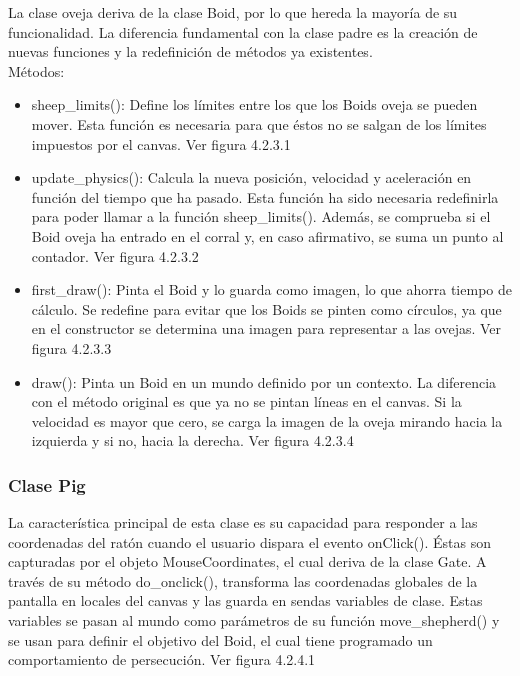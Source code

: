 La clase oveja deriva de la clase Boid, por lo que hereda la mayoría de su funcionalidad. La diferencia fundamental con la clase padre es 
la creación de nuevas funciones y la redefinición de métodos ya existentes.\\

Métodos:
\begin{itemize}
\item sheep\_limits(): Define los límites entre los que los Boids oveja se pueden mover. Esta función es necesaria para que éstos no se 
salgan de los límites impuestos por el canvas. Ver figura 4.2.3.1

\item  update\_physics(): Calcula la nueva posición, velocidad y aceleración en función del tiempo que ha pasado. Esta función ha sido 
necesaria redefinirla para poder llamar a la función sheep\_limits(). Además, se comprueba si el Boid oveja ha entrado en el corral y, en 
caso afirmativo, se suma un punto al contador. Ver figura 4.2.3.2

\item  first\_draw():  Pinta el Boid y lo guarda como imagen, lo que ahorra tiempo de cálculo. Se redefine para evitar que los Boids se 
pinten como círculos, ya que en el constructor se determina una imagen para representar a las ovejas. Ver figura 4.2.3.3

\item  draw(): Pinta un Boid en un mundo definido por un contexto. La diferencia con el método original es que ya no se pintan líneas en 
el canvas. Si la velocidad es mayor que cero, se carga la imagen de la oveja mirando hacia la izquierda y si no, hacia la derecha. 
Ver figura 4.2.3.4

\end{itemize}



\subsubsection{Clase Pig}
\label{subsubsection:pig}

La característica principal de esta clase es su capacidad para responder a las coordenadas del ratón cuando el usuario dispara el evento 
onClick(). Éstas son capturadas por el objeto MouseCoordinates, el cual deriva de la clase Gate. A través de su método do\_onclick(), 
transforma las coordenadas globales de la pantalla en locales del canvas y las guarda en sendas variables de clase. Estas variables se 
pasan al mundo como parámetros de su función move\_shepherd() y se usan para definir el objetivo del Boid, el cual tiene programado un 
comportamiento de persecución. Ver figura 4.2.4.1\\

